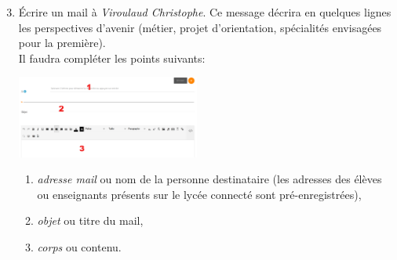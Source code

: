 \documentclass[svgnames,11pt]{beamer}
\begin{document}
\begin{frame}
    \frametitle{}
    \setcounter{compteuractivite}{4}

    \begin{activite}
    \begin{enumerate}
        \setcounter{enumi}{2}
        \item Écrire un mail à \emph{Viroulaud Christophe}. Ce message décrira en quelques lignes les perspectives d'avenir (métier, projet d'orientation, spécialités envisagées pour la première). \\ Il faudra compléter les points suivants:
        \begin{center}
        \centering
        \includegraphics[width=6cm]{ressources/ecriremail.png}
        \end{center}
        \begin{enumerate}
            \item \emph{adresse mail} ou nom de la personne destinataire (les adresses des élèves ou enseignants présents sur le lycée connecté sont pré-enregistrées),
            \item \emph{objet} ou titre du mail,
            \item \emph{corps} ou contenu.
        \end{enumerate}
    \end{enumerate}
    \end{activite}

\end{frame}
\end{document}
